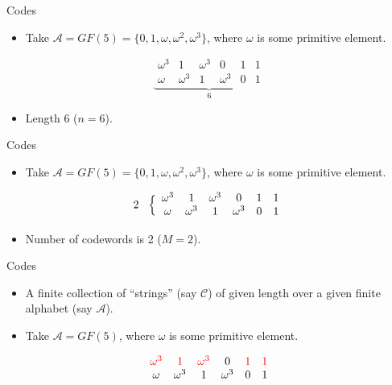 \documentclass{beamer}
\newcommand{\A}{\mathcal{A}}
\newcommand{\C}{\mathscr{C}}
\newcommand{\rred}[1]{\textcolor{red}{#1}}
\begin{document}
 
 \begin{frame}{Codes}

 \begin{itemize}
  \item Take $\A = GF(5) = \{0, 1, \omega, \omega^2, \omega^3\}$, where $\omega$ is some primitive element.
 \end{itemize}
 
 \[
 \underbrace{
  \begin{array}{cccccc}
\omega^3&1&\omega^3&0&1&1\\ 
\omega&\omega^3&1&\omega^3&0&1
  \end{array}}_{6}
 \]
 \begin{itemize}
  \item Length 6 ($n=6$).
 \end{itemize}
 
 \end{frame}
 
 
\begin{frame}{Codes}

 \begin{itemize}
  \item Take $\A = GF(5) = \{0, 1, \omega, \omega^2, \omega^3\}$, where $\omega$ is some primitive element.
 \end{itemize}
 \[
 2 \hspace{3mm}
  \Big\{
  \begin{array}{cccccc}
\omega^3&1&\omega^3&0&1&1\\ 
\omega&\omega^3&1&\omega^3&0&1
  \end{array}
 \]
 \begin{itemize}
  \item Number of codewords is 2 ($M=2$).
 \end{itemize}
 
 \end{frame}
 
 
 \begin{frame}{Codes}
 
 \begin{itemize}
  \item A finite collection of ``strings'' (say $\C$) of given length over a given finite alphabet (say $\A$).
  \item Take $\A = GF(5)$, where $\omega$ is some primitive element.
 \end{itemize}
 
 \[
  \begin{array}{cccccc}
\rred{\omega^3} & \rred{1} & \rred{\omega^3} & 0 & \rred{1} & \rred{1} \\
\omega & \omega^3 & 1 & \omega^3 & 0 & 1
  \end{array}
 \]
 
\end{frame}
\end{document}
